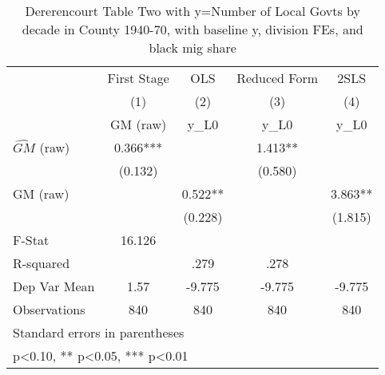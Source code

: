 \begin{table}[htbp]\centering
\def\sym#1{\ifmmode^{#1}\else\(^{#1}\)\fi}
\caption{Dererencourt Table Two with y=Number of Local Govts by decade in County 1940-70, with baseline y, division FEs, and black mig share}
\begin{tabular}{l*{4}{c}}
\toprule
                    & First Stage   &         OLS   &Reduced Form   &        2SLS   \\
                    &\multicolumn{1}{c}{(1)}&\multicolumn{1}{c}{(2)}&\multicolumn{1}{c}{(3)}&\multicolumn{1}{c}{(4)}\\
                    &\multicolumn{1}{c}{GM  (raw)}&\multicolumn{1}{c}{y\_L0}&\multicolumn{1}{c}{y\_L0}&\multicolumn{1}{c}{y\_L0}\\
\midrule
$\hat{GM}$ (raw)    &       0.366***&               &       1.413** &               \\
                    &     (0.132)   &               &     (0.580)   &               \\
\addlinespace
GM  (raw)           &               &       0.522** &               &       3.863** \\
                    &               &     (0.228)   &               &     (1.815)   \\
\midrule
F-Stat              &      16.126   &               &               &               \\
R-squared           &               &        .279   &        .278   &               \\
Dep Var Mean        &        1.57   &      -9.775   &      -9.775   &      -9.775   \\
Observations        &         840   &         840   &         840   &         840   \\
\bottomrule
\multicolumn{5}{l}{\footnotesize Standard errors in parentheses}\\
\multicolumn{5}{l}{\footnotesize * p<0.10, ** p<0.05, *** p<0.01}\\
\end{tabular}
\end{table}
